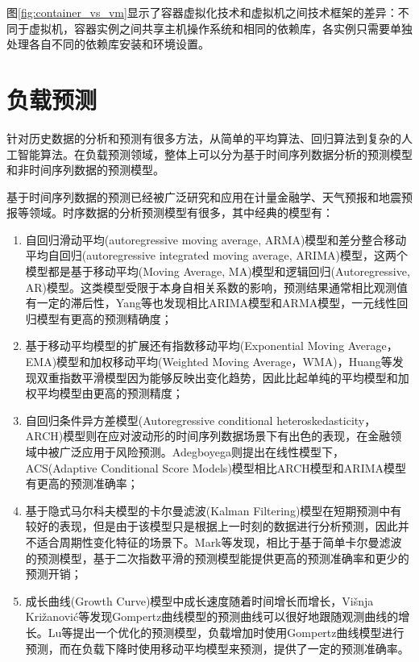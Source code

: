 图\ref{fig:container_vs_vm}显示了容器虚拟化技术和虚拟机之间技术框架的差异：不同于虚拟机，容器实例之间共享主机操作系统和相同的依赖库，各实例只需要单独处理各自不同的依赖库安装和环境设置。

\section{负载预测}
针对历史数据的分析和预测有很多方法，从简单的平均算法、回归算法到复杂的人工智能算法。在负载预测领域，整体上可以分为基于时间序列数据\cite{hamilton1994time}分析的预测模型和非时间序列数据的预测模型。

基于时间序列数据的预测已经被广泛研究和应用在计量金融学、天气预报和地震预报等领域。时序数据的分析预测模型有很多，其中经典的模型有：
\begin{enumerate}
\item 自回归滑动平均(autoregressive moving average, ARMA)模型和差分整合移动平均自回归(autoregressive integrated moving average, ARIMA)模型，这两个模型都是基于移动平均(Moving Average, MA)模型和逻辑回归(Autoregressive, AR)模型\cite{box2015time}。这类模型受限于本身自相关系数的影响，预测结果通常相比观测值有一定的滞后性，Yang等也发现相比ARIMA模型和ARMA模型，一元线性回归模型有更高的预测精确度\cite{yang2013workload}；
\item 基于移动平均模型的扩展还有指数移动平均(Exponential Moving Average，EMA)模型\cite{xiao2013dynamic}和加权移动平均(Weighted Moving Average，WMA)\cite{wu1989time}，Huang等发现双重指数平滑模型因为能够反映出变化趋势，因此比起单纯的平均模型和加权平均模型由更高的预测精度\cite{huang2012resource}；
\item 自回归条件异方差模型(Autoregressive conditional heteroskedasticity，ARCH)模型\cite{bollerslev1986generalized}则在应对波动形的时间序列数据场景下有出色的表现，在金融领域中被广泛应用于风险预测。Adegboyega则提出在线性模型下，ACS(Adaptive Conditional Score Models)模型相比ARCH模型和ARIMA模型有更高的预测准确率\cite{adegboyega2015dynamic}；
\item 基于隐式马尔科夫模型的卡尔曼滤波(Kalman Filtering)模型\cite{goodwin2014adaptive}在短期预测中有较好的表现，但是由于该模型只是根据上一时刻的数据进行分析预测，因此并不适合周期性变化特征的场景下。Mark等发现，相比于基于简单卡尔曼滤波的预测模型，基于二次指数平滑的预测模型能提供更高的预测准确率和更少的预测开销\cite{mark2011evolutionary}；
\item 成长曲线(Growth Curve)模型中成长速度随着时间增长而增长，Višnja Križanović等发现Gompertz曲线模型的预测曲线可以很好地跟随观测曲线的增长\cite{vcik2016comparison}。Lu等提出一个优化的预测模型，负载增加时使用Gompertz曲线模型进行预测，而在负载下降时使用移动平均模型来预测，提供了一定的预测准确率\cite{lu2014dynamic}。
\end{enumerate}

